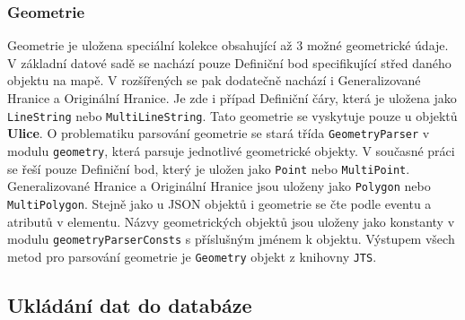 \subsubsection*{Geometrie}
Geometrie je uložena speciální kolekce obsahující až 3 možné geometrické údaje.
V základní datové sadě se nachází pouze Definiční bod specifikující střed daného objektu na mapě.
V rozšířených se pak dodatečně nachází i Generalizované Hranice a Originální Hranice.
Je zde i případ Definiční čáry, která je uložena jako \texttt{LineString} nebo \texttt{MultiLineString}.
Tato geometrie se vyskytuje pouze u objektů \textbf{Ulice}.
O problematiku parsování geometrie se stará třída \texttt{GeometryParser} v modulu \texttt{geometry}, která parsuje jednotlivé geometrické objekty.
V současné práci se řeší pouze Definiční bod, který je uložen jako \texttt{Point} nebo \texttt{MultiPoint}.
Generalizované Hranice a Originální Hranice jsou uloženy jako \texttt{Polygon} nebo \texttt{MultiPolygon}.
Stejně jako u JSON objektů i geometrie se čte podle eventu a atributů v elementu.
Názvy geometrických objektů jsou uloženy jako konstanty v modulu \texttt{geometryParserConsts} s příslušným jménem k objektu.
Výstupem všech metod pro parsování geometrie je \texttt{Geometry} objekt z knihovny \texttt{JTS}.

\subsection{Ukládání dat do databáze}